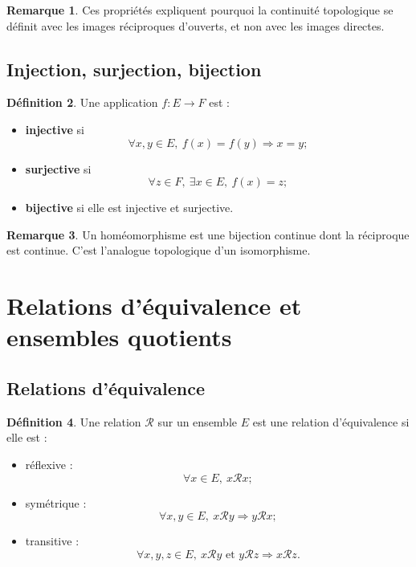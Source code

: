\documentclass[11pt,a4paper]{article}
\theoremstyle{definition}
\newtheorem{definition}{Définition}[section]
\newtheorem{remarque}[definition]{Remarque}
\theoremstyle{plain}
\begin{document}
\begin{remarque}
Ces propriétés expliquent pourquoi la continuité topologique se définit avec les images réciproques d'ouverts, et non avec les images directes.
\end{remarque}

\subsection{Injection, surjection, bijection}

\begin{definition}
Une application $f:E\to F$ est :
\begin{itemize}
    \item \textbf{injective} si
    \[
    \forall x,y\in E,\ f(x)=f(y)\Rightarrow x=y ;
    \]
    \item \textbf{surjective} si
    \[
    \forall z\in F,\ \exists x\in E,\ f(x)=z ;
    \]
    \item \textbf{bijective} si elle est injective et surjective.
\end{itemize}
\end{definition}

\begin{remarque}
Un homéomorphisme est une bijection continue dont la réciproque est continue.
C'est l'analogue topologique d'un isomorphisme.
\end{remarque}

\section{Relations d'équivalence et ensembles quotients}

\subsection{Relations d'équivalence}

\begin{definition}
Une relation $\mathcal R$ sur un ensemble $E$ est une relation d'équivalence si elle est :
\begin{itemize}
    \item réflexive :
    \[
    \forall x\in E,\ x\mathcal R x ;
    \]
    \item symétrique :
    \[
    \forall x,y\in E,\ x\mathcal R y\Rightarrow y\mathcal R x ;
    \]
    \item transitive :
    \[
    \forall x,y,z\in E,\ x\mathcal R y \text{ et } y\mathcal R z
    \Rightarrow x\mathcal R z.
    \]
\end{itemize}
\end{definition}
\end{document}
